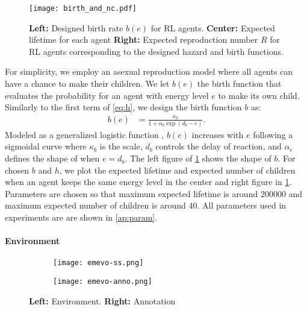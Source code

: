 \begin{figure}[t]
  \centering{}
  \texttt{[image: birth\_and\_nc.pdf]}
  \caption{
    \textbf{Left:} Designed birth rate $b(e)$ for RL agents.
    \textbf{Center:} Expected lifetime for each agent
    \textbf{Right:} Expected reproduction number $R$ for RL agents corresponding to the designed hazard and birth functions.
  }\label{figure:bnc}
\end{figure}

For simplicity, we employ an asexual reproduction model where all agents can have a chance to make their children. We let $b(e)$ the birth function that evaluates the probability for an agent with energy level $e$ to make its own child. Similarly to the first term of \cref{eq:h}, we design the birth function $b$ as:
\begin{align}
 b(e) &=  \frac{\kappa_{b}}{1 + \alpha_{b}\exp(d_{b} - e)}. \label{eq:b}
\end{align}
Modeled as a generalized logistic function \citep{richardsFlexibleGrowthFunction1959}, $b(e)$ increases with $e$ following a sigmoidal curve where $\kappa_{b}$ is the scale, $d_{b}$ controls the delay of reaction, and $\alpha_{e}$ defines the shape of when $e=d_{b}$. The left figure of \cref{figure:bnc} shows the shape of $b$. For chosen $b$ and $h$, we plot the expected lifetime and expected number of children when an agent keeps the same energy level in the center and right figure in \cref{figure:bnc}. Parameters are chosen so that maximum expected lifetime is around \num{200000} and maximum expected number of children is around 40. All parameters used in experiments are are shown in \cref{ap:param}.

\paragraph{Environment}

\begin{figure}[t]
  \begin{subfigure}[t]{6cm}
    \centering
    \texttt{[image: emevo-ss.png]}
  \end{subfigure}
  \begin{subfigure}[t]{8cm}
    \centering
    \texttt{[image: emevo-anno.png]}
  \end{subfigure}
  \caption{
    \textbf{Left:} Environment.
    \textbf{Right:} Annotation
  }\label{figure:env}
\end{figure}

